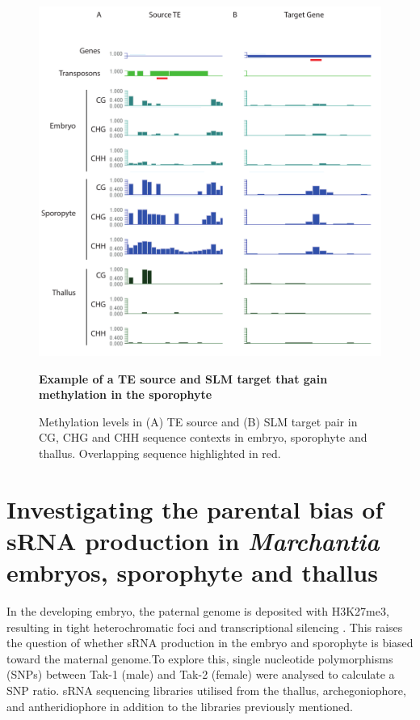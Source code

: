 \begin{figure}[htbp!] 
\centering    
    \includegraphics[width=1\textwidth]{Chapter3/Figs/Figure6_pairs_examples.pdf}
\caption{\textbf{Example of a TE  source and SLM target that gain methylation in the sporophyte}}
\label{fig:TE_SLM_pairs}
\captionsetup{font=small}
    \caption*{Methylation levels in (A) TE source and (B) SLM target pair in CG, CHG and CHH sequence contexts in embryo, sporophyte and thallus. Overlapping sequence highlighted in red.}
\end{figure}

\section{Investigating the parental bias of sRNA production in \textit{Marchantia} embryos, sporophyte and thallus}

In the developing embryo, the paternal genome is deposited with H3K27me3, resulting in tight heterochromatic foci and transcriptional silencing \citep{RN160}. This raises the question of whether sRNA production in the embryo and sporophyte is biased toward the maternal genome.To explore this, single nucleotide polymorphisms (SNPs) between Tak-1 (male) and Tak-2 (female) were analysed to calculate a SNP ratio. sRNA sequencing libraries utilised from the thallus, archegoniophore, and antheridiophore \citep{RN265} in addition to the libraries previously mentioned.

